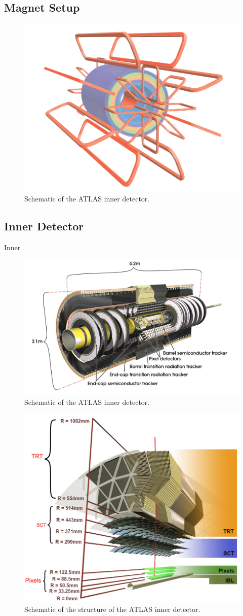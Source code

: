\subsection{Magnet Setup}
\begin{figure}[h!]
	\centering
	\includegraphics[width=0.5\columnwidth]{../ThesisImages/LHCImages/ATLASMagnetWinding.png}
	\caption{Schematic of the ATLAS inner detector.\cite{ATLAS}
	}
	\label{fig:ATLASMagnetWinding}
\end{figure}

\subsection{Inner Detector}

Inner
\begin{figure}[h!]
	\centering
	\includegraphics[width=0.5\columnwidth]{../ThesisImages/LHCImages/ATLASInnerDetector.png}
	\caption{Schematic of the ATLAS inner detector.\cite{ATLAS}
	}
	\label{fig:ATLASInnerDet}
\end{figure}


\begin{figure}[h!]
	\centering
	\includegraphics[width=0.5\columnwidth]{../ThesisImages/LHCImages/ATLASInnerStructure.png}
	\caption{Schematic of the structure of the ATLAS inner detector.\cite{ATLAS}
	}
	\label{fig:ATLASInnerDet}
\end{figure}

